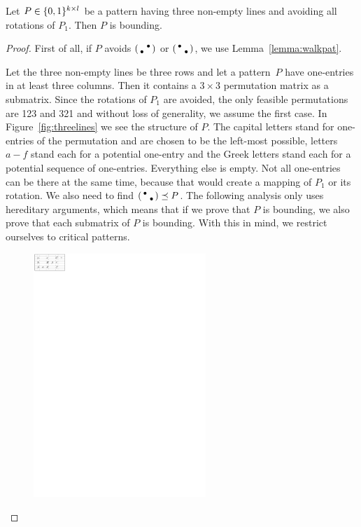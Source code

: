 \begin{lemma}
\label{lemma:three}
Let $P\in\{0,1\}^{k\times l}$ be a pattern having three non-empty lines and avoiding all rotations of $P_1$. Then $P$ is bounding.
\end{lemma}
\begin{proof}
First of all, if $P$ avoids $\left(\begin{smallmatrix} &\bullet\\\bullet& \end{smallmatrix}\right)$ or $\left(\begin{smallmatrix}\bullet& \\ &\bullet\end{smallmatrix}\right)$, we use Lemma~\ref{lemma:walkpat}.

Let the three non-empty lines be three rows and let a pattern~$P$ have one-entries in at least three columns. Then it contains a $3\times3$ permutation matrix as a submatrix. Since the rotations of $P_1$ are avoided, the only feasible permutations are 123 and 321 and without loss of generality, we assume the first case. In Figure~\ref{fig:threelines} we see the structure of $P$. The capital letters stand for one-entries of the permutation and are chosen to be the left-most possible, letters $a-f$ stand each for a potential one-entry and the Greek letters stand each for a potential sequence of one-entries. Everything else is empty. Not all one-entries can be there at the same time, because that would create a mapping of $P_1$ or its rotation. We also need to find $\left(\begin{smallmatrix}\bullet& \\ &\bullet\end{smallmatrix}\right)\preceq P$. The following analysis only uses hereditary arguments, which means that if we prove that $P$ is bounding, we also prove that each submatrix of $P$ is bounding. With this in mind, we restrict ourselves to critical patterns.
\begin{figure}[!ht]
	\centering
	\includegraphics[width=65mm]{img/threelines.pdf}

\end{figure}
\end{proof}
